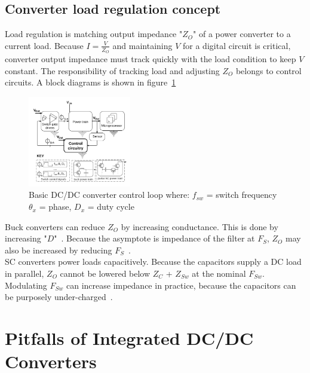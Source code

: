 \documentclass[letterpaper,twocolumn,10pt]{article}
\begin{document}
\subsection{Converter load regulation concept} \label{LoadRegulationSection}
Load regulation is matching output impedance "$Z_O$" of a power converter to a current load. Because $I= \frac{V}{Z_O}$ and maintaining $V$ for a digital circuit is critical, converter output impedance must track quickly with the load condition to keep $V$ constant. The responsibility of tracking load and adjusting $Z_O$ belongs to control circuits. A block diagrams is shown in figure~\ref{ControlCKBlockDiags}\\
\begin{figure}[here]
\includegraphics[width=0.4\textwidth]{BasicControlBlockDiag}
\caption{Basic DC/DC converter control loop where:
$f_{sw}$ = switch frequency $\theta_x$ = phase, $D_x$ = duty cycle}
\label{ControlCKBlockDiags}
\end{figure}
Buck converters can reduce $Z_O$ by increasing conductance. This is done by increasing "$D$"~\cite{Kurson2006}. Because the asymptote is impedance of the filter at $F_S$, $Z_O$ may also be increased by reducing $F_S$~\cite{Alghamdi2012}.\\ %
SC converters power loads capacitively. Because the capacitors supply a DC load in parallel, $Z_O$ cannot be lowered below $Z_C$ + $Z_{Sw}$ at the nominal $F_{Sw}$. Modulating $F_{Sw}$ can increase impedance in practice, because the capacitors can be purposely under-charged~\cite{Seeman2008}.\\

\section{Pitfalls of Integrated DC/DC Converters} \label{DesignOfIntegratedDCDCConverters}
\end{document}
